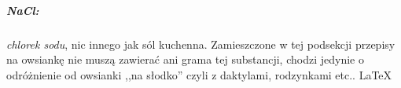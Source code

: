\documentclass[./KNIGA.tex]{subfiles}
\begin{document}
\subparagraph{NaCl:}
\emph{chlorek sodu}, nic innego jak sól kuchenna. Zamieszczone w tej podsekcji przepisy na owsiankę nie muszą zawierać ani grama tej substancji, chodzi jedynie o odróżnienie od owsianki ,,na słodko'' czyli z daktylami, rodzynkami etc.. \LaTeX
\end{document}
